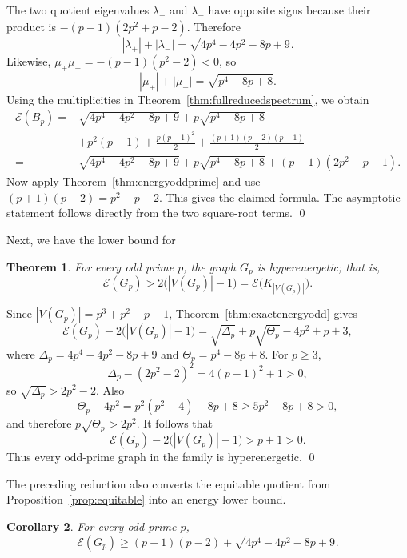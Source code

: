 \documentclass[12pt]{article}
\renewenvironment{proof}{{\bf \noindent Proof.}}{\qed}
\newtheorem{theorem}{Theorem}[section]
\newtheorem{corollary}[theorem]{Corollary}
\theoremstyle{definition}
\begin{document}
	\begin{proof}
		The two quotient eigenvalues $\lambda_+$ and $\lambda_-$ have opposite signs because their product is $-(p-1)(2p^2+p-2)$. Therefore
		$$
		|\lambda_+|+|\lambda_-|=\sqrt{4p^4-4p^2-8p+9}.
		$$
		Likewise, $\mu_+\mu_-=-(p-1)(p^2-2)<0$, so
		$$
		|\mu_+|+|\mu_-|=\sqrt{p^4-8p+8}.
		$$
		Using the multiplicities in Theorem~\ref{thm:fullreducedspectrum}, we obtain
		$$
		\begin{aligned}
			\mathcal E(B_p)
			={}&\sqrt{4p^4-4p^2-8p+9}
			+p\sqrt{p^4-8p+8}\\
			&+p^2(p-1)
			+\frac{p(p-1)^2}{2}
			+\frac{(p+1)(p-2)(p-1)}{2}\\
			={}&\sqrt{4p^4-4p^2-8p+9}
			+p\sqrt{p^4-8p+8}
			+(p-1)(2p^2-p-1).
		\end{aligned}
		$$
		Now apply Theorem~\ref{thm:energyoddprime} and use $(p+1)(p-2)=p^2-p-2$. This gives the claimed formula. The asymptotic statement follows directly from the two square-root terms.
	\end{proof}
	
	\medskip
	Next, we have the lower bound for 
	\begin{theorem}\label{thm:hyperodd}
		For every odd prime $p$, the graph $G_p$ is hyperenergetic; that is,
		$$
		\mathcal E(G_p)>2\bigl(|V(G_p)|-1\bigr)=\mathcal E\bigl(K_{|V(G_p)|}\bigr).
		$$
	\end{theorem}
	
	\begin{proof}
		Since $|V(G_p)|=p^3+p^2-p-1$, Theorem~\ref{thm:exactenergyodd} gives
		$$
		\mathcal E(G_p)-2\bigl(|V(G_p)|-1\bigr)
		=\sqrt{\Delta_p}+p\sqrt{\Theta_p}-4p^2+p+3,
		$$
		where $\Delta_p=4p^4-4p^2-8p+9$ and $\Theta_p=p^4-8p+8$. For $p\ge3$,
		$$
		\Delta_p-(2p^2-2)^2=4(p-1)^2+1>0,
		$$
		so $\sqrt{\Delta_p}>2p^2-2$. Also
		$$
		\Theta_p-4p^2=p^2(p^2-4)-8p+8\ge5p^2-8p+8>0,
		$$
		and therefore $p\sqrt{\Theta_p}>2p^2$. It follows that
		$$
		\mathcal E(G_p)-2\bigl(|V(G_p)|-1\bigr)>p+1>0.
		$$
		Thus every odd-prime graph in the family is hyperenergetic.
	\end{proof}
	
	\medskip
	The preceding reduction also converts the equitable quotient from Proposition~\ref{prop:equitable} into an energy lower bound.
	
	\begin{corollary}\label{cor:energyquotient}
		For every odd prime $p$,
		$$
		\mathcal E(G_p)\ge (p+1)(p-2)+\sqrt{4p^4-4p^2-8p+9}.
		$$
	\end{corollary}
	
\end{document}

